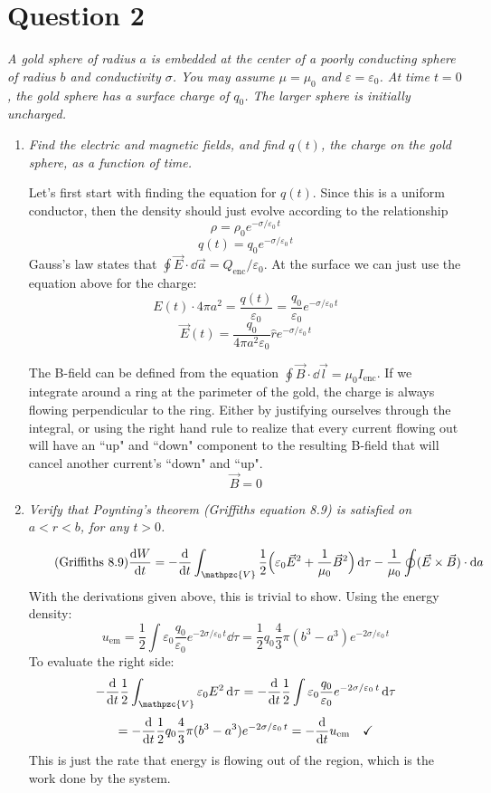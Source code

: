 \documentclass[12pt]{article}
\begin{document}
\newpage

\section*{Question 2}
{\sl A gold sphere of radius $a$ is embedded at the center of a poorly conducting sphere of radius $b$ and conductivity $\sigma$. You may assume $\mu = \mu_0$ and $\varepsilon = \varepsilon_0$. At time $t=0$, the gold sphere has a surface charge of $q_0$. The larger sphere is initially uncharged.}
\begin{enumerate}[label=\alph*)]
\item {\sl Find the electric and magnetic fields, and find $q(t)$, the charge on the gold sphere, as a function of time.} 

Let's first start with finding the equation for $q(t)$. Since this is a uniform conductor, then the density should just evolve according to the relationship
\[\rho = \rho_0 e^{-\sigma/\varepsilon_0 \, t}\]
\[\boxed{q(t) = q_0 e^{-\sigma/\varepsilon_0 \, t}}\]
Gauss's law states that $\oint \vec{E} \cdot \dd{\vec{a}} = Q_{\text{enc}}/\varepsilon_0$. At the surface we can just use the equation above for the charge:
\[E(t) \cdot 4\pi a^2 = \frac{q(t)}{\varepsilon_0} = \frac{q_0}{\varepsilon_0} e^{-\sigma/\varepsilon_0 \, t}\]
\[\boxed{\vec{E}(t) = \frac{q_0}{4 \pi a^2 \varepsilon_0} \hat{r} e^{-\sigma/\varepsilon_0 \, t}}\]

The B-field can be defined from the equation $\oint \vec{B} \cdot \dd{\vec{l}} = \mu_0 I_{\text{enc}}$. If we integrate around a ring at the parimeter of the gold, the charge is always flowing perpendicular to the ring. Either by justifying ourselves through the integral, or using the right hand rule to realize that every current flowing out will have an ``up" and ``down" component to the resulting B-field that will cancel another current's ``down" and ``up". 
\[\boxed{\vec{B} = 0}\]

\item {\sl Verify that Poynting's theorem (Griffiths equation 8.9) is satisfied on $a<r<b$, for any $t>0$.}

\begin{equation}
	\tag{Griffiths 8.9}
	\dv{W}{t} = - \dv{t} \int_\mathpzc{V} \frac{1}{2}\Big(\varepsilon_0 \vec{E}^2 + \frac{1}{\mu_0}\vec{B}^2\Big)\dd{\tau} - \frac{1}{\mu_0}\oint (\vec{E}\times \vec{B})\cdot \dd{a}
	\label{eq:2.1}
\end{equation}
With the derivations given above, this is trivial to show. Using the energy density:
\[u_{\text{em}} = \frac{1}{2}\int \varepsilon_0 \frac{q_0}{\varepsilon_0}e^{-2 \sigma / \varepsilon_0 \, t} \dd{\tau} = \frac{1}{2} q_0 \frac{4}{3}\pi (b^3 - a^3)e^{-2 \sigma / \varepsilon_0 \, t}\]
To evaluate the right side:
\[-\dv{t}\frac{1}{2}\int_\mathpzc{V}\varepsilon_0 E^2 \dd{\tau} = -\dv{t} \frac{1}{2}\int\varepsilon_0 \frac{q_0}{\varepsilon_0}e^{-2 \sigma / \varepsilon_0 \, t}\dd{\tau}\]
\[= -\dv{t} \frac{1}{2}q_0 \frac{4}{3}\pi (b^3 -a^3)e^{-2 \sigma / \varepsilon_0 \, t} = -\dv{t} u_{\text{em}} \quad \checkmark\]
This is just the rate that energy is flowing out of the region, which is the work done by the system. 



\end{enumerate}
\end{document}

